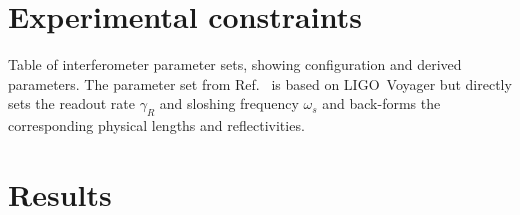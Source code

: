 
\section{Experimental constraints} %




\begin{table}
	\caption{Table of interferometer parameter sets, showing configuration and derived parameters. The parameter set from Ref.~\cite{} is based on LIGO~Voyager but directly sets the readout rate $\gamma_R$ and sloshing frequency $\omega_s$ and back-forms the corresponding physical lengths and reflectivities. }
	\label{tab:}
\end{table}

\section{Results}


